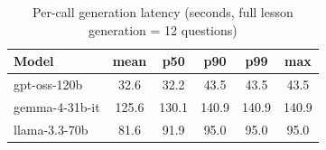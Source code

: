 \begin{table}[htbp]
\centering
\caption{Per-call generation latency (seconds, full lesson generation = 12 questions)}
\label{tab:gen_latency}
\renewcommand{\arraystretch}{1.3}
\begin{tabular}{|l|c|c|c|c|c|}
\hline
\textbf{Model} & \textbf{mean} & \textbf{p50} & \textbf{p90} & \textbf{p99} & \textbf{max} \\
\hline
gpt-oss-120b & 32.6 & 32.2 & 43.5 & 43.5 & 43.5 \\
gemma-4-31b-it & 125.6 & 130.1 & 140.9 & 140.9 & 140.9 \\
llama-3.3-70b & 81.6 & 91.9 & 95.0 & 95.0 & 95.0 \\
\hline
\end{tabular}
\end{table}
